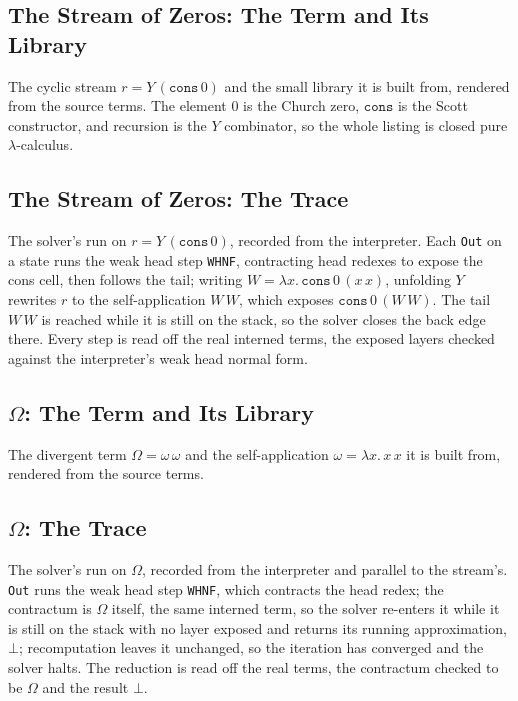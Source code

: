 \subsection{The Stream of Zeros: The Term and Its Library}\label{app:cyclic-zeros-code}
The cyclic stream $r = Y\,(\mathtt{cons}\,0)$ and the small library it is built from, rendered from the source terms. The element $0$ is the Church zero, $\mathtt{cons}$ is the Scott constructor, and recursion is the $Y$ combinator, so the whole listing is closed pure $\lambda$-calculus.


\subsection{The Stream of Zeros: The Trace}\label{app:cyclic-zeros-trace}
The solver's run on $r = Y\,(\mathtt{cons}\,0)$, recorded from the interpreter. Each \texttt{Out} on a state runs the weak head step \texttt{WHNF}, contracting head redexes to expose the cons cell, then follows the tail; writing $W = \lambda x.\,\mathtt{cons}\,0\,(x\,x)$, unfolding $Y$ rewrites $r$ to the self-application $W\,W$, which exposes $\mathtt{cons}\,0\,(W\,W)$. The tail $W\,W$ is reached while it is still on the stack, so the solver closes the back edge there. Every step is read off the real interned terms, the exposed layers checked against the interpreter's weak head normal form.


\subsection{$\Omega$: The Term and Its Library}\label{app:omega-code}
The divergent term $\Omega = \omega\,\omega$ and the self-application $\omega = \lambda x.\,x\,x$ it is built from, rendered from the source terms.


\subsection{$\Omega$: The Trace}\label{app:omega-trace}
The solver's run on $\Omega$, recorded from the interpreter and parallel to the stream's. \texttt{Out} runs the weak head step \texttt{WHNF}, which contracts the head redex; the contractum is $\Omega$ itself, the same interned term, so the solver re-enters it while it is still on the stack with no layer exposed and returns its running approximation, $\bot$; recomputation leaves it unchanged, so the iteration has converged and the solver halts. The reduction is read off the real terms, the contractum checked to be $\Omega$ and the result $\bot$.

\fi %

\ifColambdaBody\else


\fi


